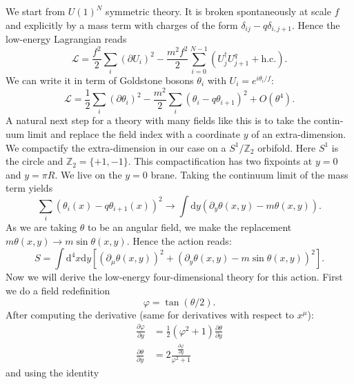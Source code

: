 \documentclass[master,       %
               twoside,        %
               BCOR10mm,       %
               english,ngerman, %
               ]{GAUBM}
\begin{document}
\begin{otherlanguage}{english}
We start from $U(1)^N$ symmetric theory. It is broken spontaneously at scale $f$ and explicitly by a mass term with charges of the form $\delta_{ij} - q \delta_{i,j+1}$. Hence the low-energy Lagrangian reads
\begin{equation}
	\mathcal{L} = \frac{f^2}{2} \sum_i (\partial U_i)^2 - \frac{m^2 f^2}{2} \sum_{i = 0}^{N - 1} (U_j^\dagger U^q_{j + 1} + \mathrm{h.c.}).
\end{equation}
We can write it in term of Goldstone bosons $\theta_i$ with $U_i = e^{i \theta_i/ f}$:
\begin{equation}
	\mathcal{L} = \frac{1}{2} \sum_i (\partial \theta_i)^2 - \frac{m^2}{2} \sum_i (\theta_i - q \theta_{i + 1})^2 + O(\theta^4).
\end{equation}
A natural next step for a theory with many fields like this is to take the continuum limit and replace the field index with a coordinate $y$ of an extra-dimension.
We compactify the extra-dimension in our case on a $S^1 / \mathbb{Z}_2$ orbifold. Here $S^1$ is the circle and $\mathbb{Z}_2 = \{+1, -1\}$. This compactification has two fixpoints at $y = 0$ and $y = \pi R$. We live on the $y = 0$ brane.
Taking the continuum limit of the mass term yields
\begin{equation}
	\sum_i (\theta_i(x) - q \theta_{i + 1}(x))^2 \to \int \mathrm{d} y (\partial_y \theta(x, y) - m \theta(x, y) ).
\end{equation}
As we are taking $\theta$ to be an angular field, we make the replacement $m \theta(x, y) \to m \sin \theta(x, y)$.
Hence the action reads:
\begin{equation}
	S = \int \mathrm{d}^4 x \mathrm{d} y \left[ (\partial_\mu \theta(x, y))^2 + (\partial_y \theta(x, y) - m \sin \theta(x, y))^2 \right].
\end{equation}
Now we will derive the low-energy four-dimensional theory for this action.
First we do a field redefinition
\begin{equation}
	\varphi = \tan ( \theta / 2 ).
\end{equation}
After computing the derivative (same for derivatives with respect to $x^\mu$):
\begin{align}
	\frac{\partial \varphi}{\partial y} &= \frac{1}{2} (\varphi^2 + 1) \frac{\partial \theta}{\partial y} \nonumber \\
	\frac{\partial \theta}{\partial y} &= 2 \frac{\frac{\partial \varphi}{\partial y}}{\varphi^2 + 1}
\end{align}
and using the identity
\begin{equation}

\end{equation}
\end{otherlanguage}
\end{document}
